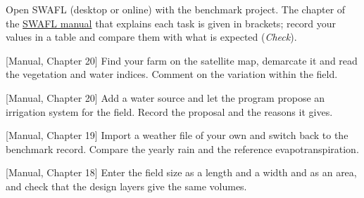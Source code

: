 {\small Open SWAFL (desktop or online) with the benchmark project. The chapter of the \href{https://github.com/halilunaziru73-creator/Coupled-Water-Fluxes-Pore-Scale-Dynamics-Precision-Irrigation-Mulching-Feedback-Loops/raw/main/Software/v1.1.0/SWAFL_Desktop/docs/manual_v1.1.0/SWAFL_Manual_v1.1.0.pdf}{SWAFL manual} that explains each task is given in brackets; record your values in a table and compare them with what is expected (\emph{Check}).}\par\vspace{3pt}
\begin{exlist}
\item {\color{khblue}[Manual, Chapter 20]} Find your farm on the satellite map, demarcate it and read the vegetation and water indices. Comment on the variation within the field.\par{}
\item {\color{khblue}[Manual, Chapter 20]} Add a water source and let the program propose an irrigation system for the field. Record the proposal and the reasons it gives.\par{}
\item {\color{khblue}[Manual, Chapter 19]} Import a weather file of your own and switch back to the benchmark record. Compare the yearly rain and the reference evapotranspiration.\par{}
\item {\color{khblue}[Manual, Chapter 18]} Enter the field size as a length and a width and as an area, and check that the design layers give the same volumes.\par{}
\end{exlist}
